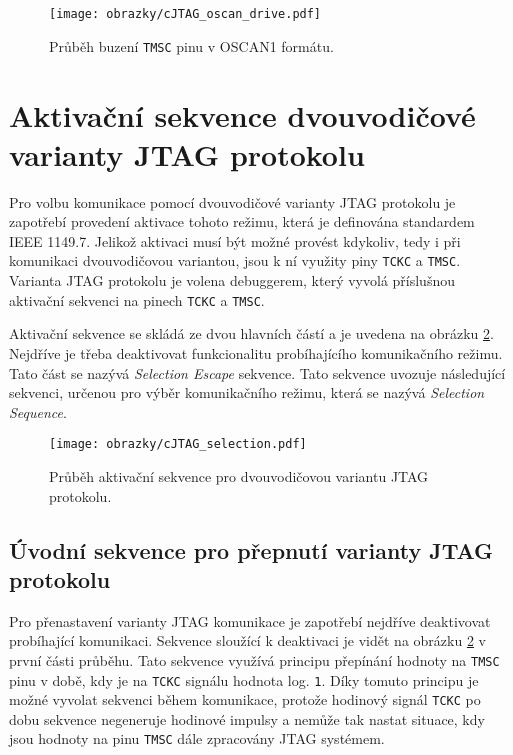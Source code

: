 \begin{figure}[!h]
  \begin{center}
    \texttt{[image: obrazky/cJTAG\_oscan\_drive.pdf]}
  \end{center}
  \caption{Průběh buzení \texttt{\acs{TMSC}} pinu v OSCAN1 formátu.}
	\label{fig:oscan_drive}
\end{figure}


\section{Aktivační sekvence dvouvodičové varianty \acs{JTAG} protokolu}
Pro volbu komunikace pomocí dvouvodičové varianty \acs{JTAG} protokolu je zapotřebí provedení aktivace tohoto režimu, která je definována standardem IEEE 1149.7. Jelikož aktivaci musí být možné provést kdykoliv, tedy i při komunikaci dvouvodičovou variantou, jsou k ní využity piny \texttt{\acs{TCKC}} a \texttt{\acs{TMSC}}. Varianta \acs{JTAG} protokolu je volena debuggerem, který vyvolá příslušnou aktivační sekvenci na pinech \texttt{\acs{TCKC}} a \texttt{\acs{TMSC}}. \cite{IEEE_1149-7}

Aktivační sekvence se skládá ze dvou hlavních částí a je uvedena na obrázku \ref{fig:cJTAG_sel}. Nejdříve je třeba deaktivovat funkcionalitu probíhajícího komunikačního režimu. Tato část se nazývá \textit{Selection Escape} sekvence. Tato sekvence uvozuje následující sekvenci, určenou pro výběr komunikačního režimu, která se nazývá \textit{Selection Sequence}. \cite{IEEE_1149-7}

\begin{figure}[!h]
  \begin{center}
    \texttt{[image: obrazky/cJTAG\_selection.pdf]}
  \end{center}
  \caption{Průběh aktivační sekvence pro dvouvodičovou variantu \acs{JTAG} protokolu.}
	\label{fig:cJTAG_sel}
\end{figure}

\subsection{Úvodní sekvence pro přepnutí varianty \acs{JTAG} protokolu}	\label{subsec:sel_escape}
Pro přenastavení varianty \acs{JTAG} komunikace je zapotřebí nejdříve deaktivovat probíhající komunikaci. Sekvence sloužící k deaktivaci je vidět na obrázku \ref{fig:cJTAG_sel} v první části průběhu. Tato sekvence využívá principu přepínání hodnoty na \texttt{\acs{TMSC}} pinu v době, kdy je na \texttt{\acs{TCKC}} signálu hodnota log. \texttt{1}. Díky tomuto principu je možné vyvolat sekvenci během komunikace, protože hodinový signál \texttt{\acs{TCKC}} po dobu sekvence negeneruje hodinové impulsy a nemůže tak nastat situace, kdy jsou hodnoty na pinu \texttt{\acs{TMSC}} dále zpracovány \acs{JTAG} systémem. \cite{IEEE_1149-7}


